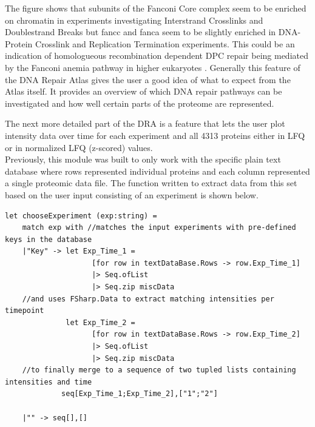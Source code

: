 The figure shows that subunits of the Fanconi Core complex seem to be enriched on chromatin in experiments investigating Interstrand Crosslinks and Doublestrand Breaks but fancc and fanca seem to be slightly enriched in DNA-Protein Crosslink and Replication Termination experiments. This could be an indication of homologueous recombination dependent DPC repair being mediated by the Fanconi anemia pathway in higher eukaryotes \citep{Stingele.2015}. Generally this feature of the DNA Repair Atlas gives the user a good idea of what to expect from the Atlas itself. It provides an overview of which DNA repair pathways can be investigated and how well certain parts of the proteome are represented.
\newpage

The next more detailed part of the DRA is a feature that lets the user plot intensity data over time for each experiment and all 4313 proteins either in LFQ or in normalized LFQ (z-scored) values.\\
Previously, this module was built to only work with the specific plain text database where rows represented individual proteins and each column represented a single proteomic data file. The function written to extract data from this set based on the user input consisting of an experiment is shown below.
\lstset{language=FSharp}
\begin{lstlisting}
let chooseExperiment (exp:string) =
    match exp with //matches the input experiments with pre-defined keys in the database
    |"Key" -> let Exp_Time_1 = 
                    [for row in textDataBase.Rows -> row.Exp_Time_1]
                    |> Seq.ofList 
                    |> Seq.zip miscData
    //and uses FSharp.Data to extract matching intensities per timepoint
              let Exp_Time_2 = 
                    [for row in textDataBase.Rows -> row.Exp_Time_2] 
                    |> Seq.ofList 
                    |> Seq.zip miscData
    //to finally merge to a sequence of two tupled lists containing intensities and time
             seq[Exp_Time_1;Exp_Time_2],["1";"2"]
                   
    |"" -> seq[],[]
\end{lstlisting}
